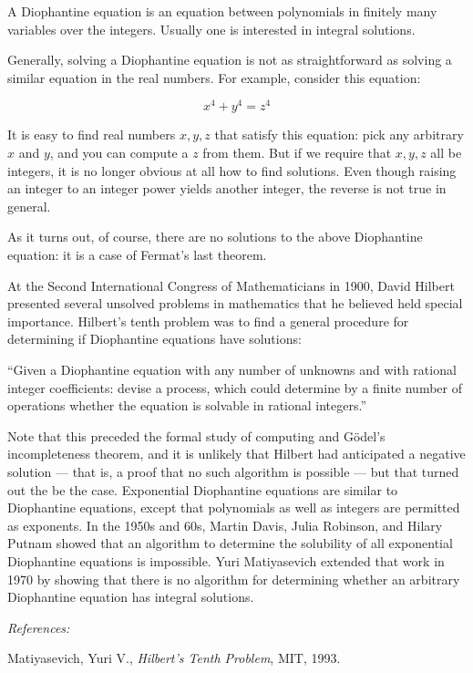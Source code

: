 \documentclass[12pt]{article}
\begin{document}
A Diophantine equation is an equation between polynomials in finitely many variables over the integers. Usually one is interested in integral solutions.

Generally, solving a Diophantine equation is not as straightforward as solving a similar equation in the real numbers.  For example, consider this equation:

$$x^4+ y^4 = z^4$$

It is easy to find real numbers $x, y, z$ that satisfy this equation: pick any arbitrary $x$ and $y$, and you can compute a $z$ from them.  But if we require that $x, y, z$ all be integers, it is no longer obvious at all how to find solutions.  Even though raising an integer to an integer power yields another integer, the reverse is not true in general.

As it turns out, of course, there are no solutions to the above Diophantine equation: it is a case of Fermat's last theorem.

At the Second International Congress of Mathematicians in 1900, David Hilbert presented several unsolved problems in mathematics that he believed held special importance.  Hilbert's tenth problem was to find a general procedure for determining if Diophantine equations have solutions:

``Given a Diophantine equation with any number of unknowns and with rational integer coefficients: devise a process, which could determine by a finite number of operations whether the equation is solvable in rational integers.''

Note that this preceded the formal study of computing and G\"odel's incompleteness theorem, and it is unlikely that Hilbert had anticipated a negative solution --- that is, a proof that no such algorithm is possible --- but that turned out the be the case. Exponential Diophantine equations are similar to Diophantine equations, except that polynomials as well as integers are permitted as exponents. In the 1950s and 60s, Martin Davis, Julia Robinson, and Hilary Putnam showed that an algorithm to determine the solubility of all exponential Diophantine equations is impossible. Yuri Matiyasevich extended that work in 1970 by showing that there is no algorithm for determining whether an arbitrary Diophantine equation has integral solutions.

{\em References:}

Matiyasevich, Yuri V., {\em Hilbert's Tenth Problem}, MIT, 1993.
\end{document}
